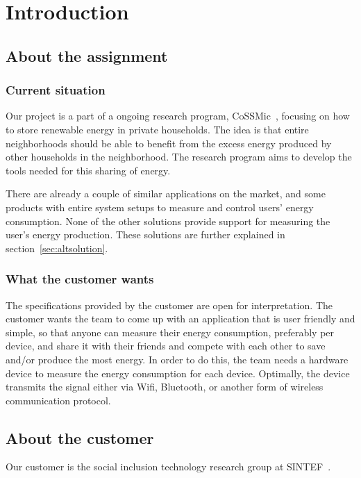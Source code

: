 \chapter{Introduction}

\section{About the assignment}
\subsection{Current situation}
Our project is a part of a ongoing research program, CoSSMic~\cite{cossmic}, focusing on how to store renewable energy in private households. The idea is that entire neighborhoods should be able to benefit from the excess energy produced by other households in the neighborhood. The research program aims to develop the tools needed for this sharing of energy. 

 There are already a couple of similar applications on the market, and some products with entire system setups to measure and control users' energy consumption.  None of the other solutions provide support for measuring the user's energy production. These solutions are further explained in section~\ref{sec:altsolution}.

\subsection{What the customer wants}
The specifications provided by the customer are open for interpretation. The customer wants the team to come up with an application that is user friendly and simple, so that anyone can measure their energy consumption, preferably per device, and share it with their friends and compete with each other to save and/or produce the most energy. In order to do this, the team needs a hardware device to measure the energy consumption for each device. Optimally, the device transmits the signal either via Wifi, Bluetooth, or another form of wireless communication protocol. 

\section{About the customer}

Our customer is the social inclusion technology research group at SINTEF~\cite{sintef}.








 


